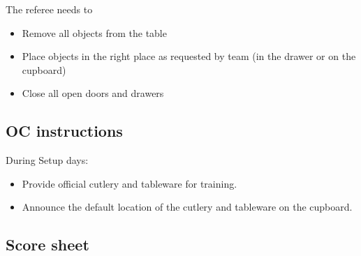 The referee needs to
\begin{itemize}
	\item Remove all objects from the table
	\item Place objects in the right place as requested by team (in the drawer or on the cupboard)
	\item Close all open doors and drawers
\end{itemize}

\subsection*{OC instructions}
During Setup days:
\begin{itemize}
	\item Provide official cutlery and tableware for training.
	\item Announce the default location of the cutlery and tableware on the cupboard.
\end{itemize}


\subsection*{Score sheet}



